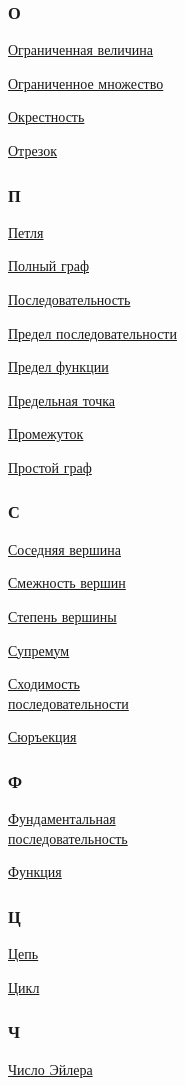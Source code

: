\begin{multicols}{3}
\subsubsection*{О}
\hyperlink{def:bounded_quantity}{Ограниченная величина}

\hyperlink{def:bounded_set}{Ограниченное множество}

\hyperlink{def:neighbourhood}{Окрестность}

\hyperlink{def:closed_interval}{Отрезок}

\subsubsection*{П}
\hyperlink{def:loop}{Петля}

\hyperlink{def:complete_graph}{Полный граф}

\hyperlink{def:sequence}{Последовательность}

\hyperlink{def:limit_of_sequence}{Предел последовательности}

\hyperlink{def:limit_of_function}{Предел функции}

\hyperlink{def:limit_point}{Предельная точка}

\hyperlink{def:interval}{Промежуток}

\hyperlink{def:simple_graph}{Простой граф}

\subsubsection*{С}
\hyperlink{def:adjacency_of_vertexes}{Соседняя вершина}

\hyperlink{def:adjacency_of_vertexes}{Смежность вершин}

\hyperlink{def:degree_of_vertex}{Степень вершины}

\hyperlink{def:supremum}{Супремум}

\hyperlink{def:convergence_of_sequence}{Сходимость\\последовательности}

\hyperlink{def:surjection}{Сюръекция}

\subsubsection*{Ф}
\hyperlink{def:fundamental_sequence}{Фундаментальная\\последовательность}

\hyperlink{def:function}{Функция}

\subsubsection*{Ц}
\hyperlink{def:trail}{Цепь}

\hyperlink{def:cycle}{Цикл}

\subsubsection*{Ч}
\hyperlink{def:Euler's_number}{Число Эйлера}
\end{multicols}